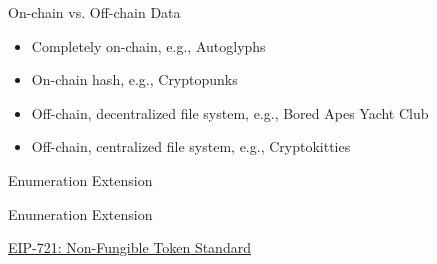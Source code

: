 \documentclass[]{beamer}
\begin{document}
\begin{frame}{On-chain vs. Off-chain Data}
	\begin{itemize}
		\item<1-> Completely on-chain, e.g., Autoglyphs %
		\item<2-> On-chain hash, e.g., Cryptopunks %
		\item<3-> Off-chain, decentralized file system, e.g., Bored Apes Yacht Club %
		\item<4-> Off-chain, centralized file system, e.g., Cryptokitties %
	\end{itemize}
\end{frame}

\begin{frame}{Enumeration Extension}
\begin{samplecode}{Enumeration Extension}
		
\end{samplecode}

\vspace{1 em}
\link \href{https://eips.ethereum.org/EIPS/eip-721}{EIP-721: Non-Fungible Token Standard}
\end{frame}

%	
%	
\end{document}
